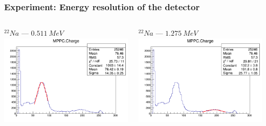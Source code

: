 \documentclass[11pt]{beamer}
\begin{document}
\begin{frame}
    \frametitle{Experiment: Energy resolution of the detector}
    \begin{columns}
        \begin{column}{0.5\textwidth}
            $^{22}Na$ --- $0.511~MeV$\\
            \includegraphics[width=1\textwidth]{figures/setup3.png}
            
        \end{column}
                \begin{column}{0.5\textwidth}
                    $^{22}Na$ --- $1.275~MeV$\\
            \includegraphics[width=1\textwidth]{figures/setup4.png}
        \end{column}
    \end{columns} 
    

\end{frame}
\end{document}
